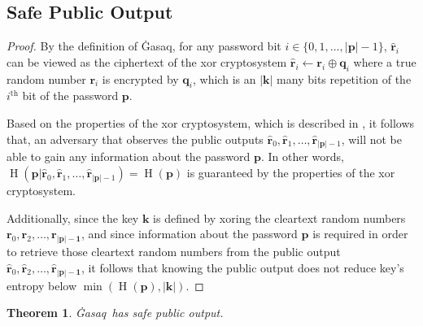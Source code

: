 \documentclass[twocolumn,hidelinks]{article}
\newcommand{\ghasaq}{Ġasaq}
\DeclareMathOperator{\entropy}{H}
\newtheorem{theorem}{Theorem}[section]
\begin{document}
\subsection{Safe Public Output}
\begin{proof}
    By the definition of \ghasaq, for any password bit $i \in \{0, 1,
    \ldots, |\mathbf{p}|-1\}$, $\mathbf{\hat r}_i$ can be viewed as the
    ciphertext of the \gls{xor} cryptosystem $\mathbf{\hat r}_i \gets
    \mathbf{r}_i \oplus \mathbf{q}_i$ where a true random number
    $\mathbf{r}_i$ is encrypted by $\mathbf{q}_i$, which is an
    $|\mathbf{k}|$ many bits repetition of the $i^{\text{th}}$ bit of the
    password $\mathbf{p}$.

    Based on the properties of the \gls{xor} cryptosystem, which is
    described in , it follows that, an
    adversary that observes the public outputs $\mathbf{\hat r}_0, \mathbf{\hat
    r}_1, \ldots, \mathbf{\hat r}_{|\mathbf{p}|-1}$, will not be able to
    gain any information about the password $\mathbf{p}$. In other words,
    $\entropy(\mathbf{p} | \mathbf{\hat r}_0, \mathbf{\hat r}_1, \ldots,
    \mathbf{\hat r}_{|\mathbf{p}|-1}) = \entropy(\mathbf{p})$ is guaranteed
    by the properties of the \gls{xor} cryptosystem.

    Additionally, since the key $\mathbf{k}$ is defined by \gls{xor}ing the
    cleartext random numbers $\mathbf{r}_0, \mathbf{r}_2, \ldots,
    \mathbf{r}_\mathbf{|\mathbf{p}|-1}$, and since information about the
    password $\mathbf{p}$ is required in order to retrieve those cleartext
    random numbers from the public output $\mathbf{\hat r}_0, \mathbf{\hat
    r}_2, \ldots, \mathbf{\hat r}_\mathbf{|\mathbf{p}|-1}$, it follows that
    knowing the public output does not reduce key's entropy below
    $\min(\entropy(\mathbf{p}), |\mathbf{k}|)$.
\end{proof}

\begin{theorem}
    \ghasaq\ has safe public output.
\end{theorem}
\end{document}
